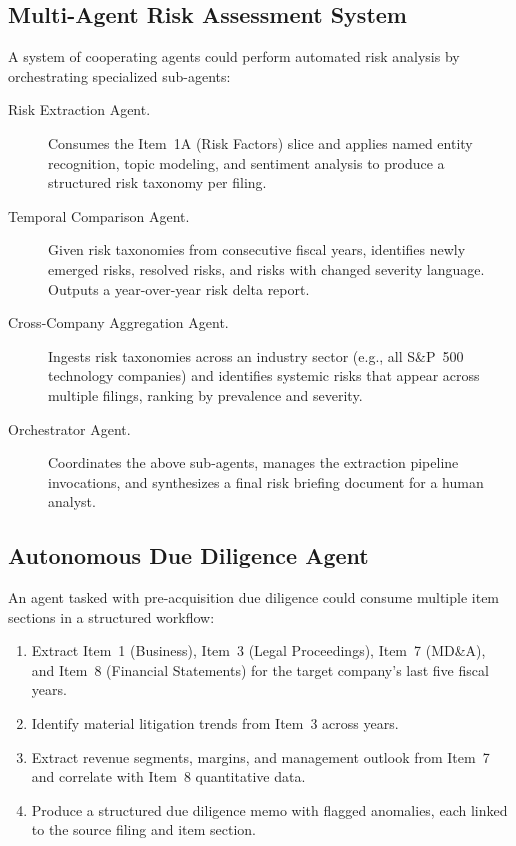 \documentclass[12pt,letterpaper,oneside]{article}
\begin{document}
\subsection{Multi-Agent Risk Assessment System}

A system of cooperating agents could perform automated risk
analysis by orchestrating specialized sub-agents:

\begin{description}
  \item[Risk Extraction Agent.]
    Consumes the Item~1A (Risk Factors) slice and applies named
    entity recognition, topic modeling, and sentiment analysis to
    produce a structured risk taxonomy per filing.

  \item[Temporal Comparison Agent.]
    Given risk taxonomies from consecutive fiscal years, identifies
    newly emerged risks, resolved risks, and risks with changed
    severity language. Outputs a year-over-year risk delta report.

  \item[Cross-Company Aggregation Agent.]
    Ingests risk taxonomies across an industry sector (e.g., all
    S\&P~500 technology companies) and identifies systemic risks
    that appear across multiple filings, ranking by prevalence and
    severity.

  \item[Orchestrator Agent.]
    Coordinates the above sub-agents, manages the extraction pipeline
    invocations, and synthesizes a final risk briefing document for
    a human analyst.
\end{description}

\subsection{Autonomous Due Diligence Agent}

An agent tasked with pre-acquisition due diligence could consume
multiple item sections in a structured workflow:

\begin{enumerate}
  \item Extract Item~1 (Business), Item~3 (Legal Proceedings),
    Item~7 (MD\&A), and Item~8 (Financial Statements) for the
    target company's last five fiscal years.
  \item Identify material litigation trends from Item~3 across years.
  \item Extract revenue segments, margins, and management outlook
    from Item~7 and correlate with Item~8 quantitative data.
  \item Produce a structured due diligence memo with flagged
    anomalies, each linked to the source filing and item section.
\end{enumerate}
\end{document}
